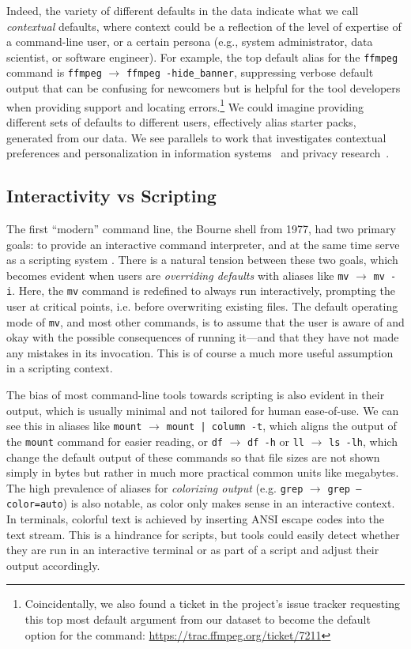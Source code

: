 \documentclass[sigconf,nonacm,screen]{acmart}
\newcommand{\alias}[2]{{\texttt{#1} $\rightarrow$ \texttt{#2}}}
\newcommand{\cmd}[1]{{\texttt{#1}}}
\begin{document}
Indeed, the variety of different defaults in the data indicate what we call \emph{contextual} defaults, where context could be a reflection of the level of expertise of a command-line user, or a certain persona (e.g., system administrator, data scientist, or software engineer).
For example, the top default alias for the \cmd{ffmpeg} command is \alias{ffmpeg}{ffmpeg -hide\_banner}, suppressing verbose default output that can be confusing for newcomers but is helpful for the tool developers when providing support and locating errors.\footnote{Coincidentally, we also found a ticket in the project's issue tracker requesting this top most default argument from our dataset to become the default option for the command: \url{https://trac.ffmpeg.org/ticket/7211}}
We could imagine providing different sets of defaults to different users, effectively alias starter packs, generated from our data.
We see parallels to work that investigates contextual preferences and personalization in information systems~\citep{de:15, stefanidis:11} and privacy research~\citep{wijesekera:18, alom:19}.

\subsection{Interactivity vs Scripting}
\label{sec:interactivity-vs-scripting}

The first ``modern'' command line, the Bourne shell from 1977, had two primary goals: to provide an interactive command interpreter, and at the same time serve as a scripting system \citep{jones:11}.
There is a natural tension between these two goals, which becomes evident when users are \emph{overriding defaults} with aliases like \alias{mv}{mv~-i}.
Here, the \cmd{mv} command is redefined to always run interactively, prompting the user at critical points, i.e. before overwriting existing files.
The default operating mode of \cmd{mv}, and most other commands, is to assume that the user is aware of and okay with the possible consequences of running it---and that they have not made any mistakes in its invocation.
This is of course a much more useful assumption in a scripting context.

The bias of most command-line tools towards scripting is also evident in their output, which is usually minimal and not tailored for human ease-of-use.
We can see this in aliases like \alias{mount}{mount~|~column -t}, which aligns the output of the \cmd{mount} command for easier reading, or \alias{df}{df~-h} or \alias{ll}{ls~-lh}, which change the default output of these commands so that file sizes are not shown simply in bytes but rather in much more practical common units like megabytes.
The high prevalence of aliases for \emph{colorizing output} (e.g. \alias{grep}{grep --color=auto}) is also notable, as color only makes sense in an interactive context.
In terminals, colorful text is achieved by inserting ANSI escape codes into the text stream.
This is a hindrance for scripts, but tools could easily detect whether they are run in an interactive terminal or as part of a script and adjust their output accordingly.
\end{document}
